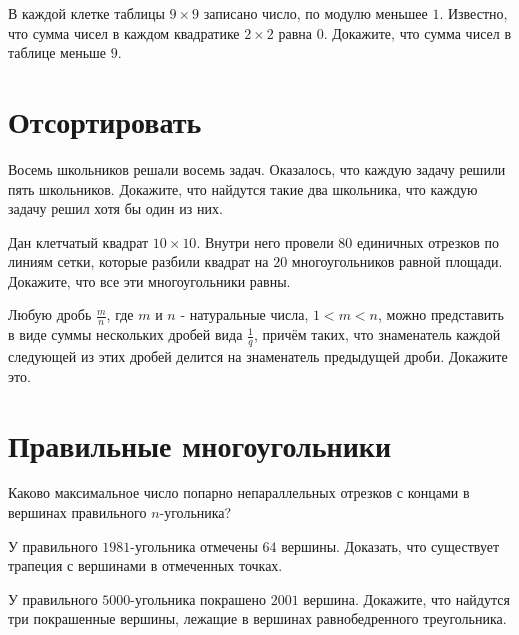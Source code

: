 \documentclass[12pt]{article}
\begin{document}
\begin{task} В каждой клетке таблицы $9 \times 9$ записано число, по модулю меньшее $1$. Известно, что сумма чисел в каждом квадратике $2 \times 2$ равна $0$. Докажите, что сумма чисел в таблице меньше $9$. 
\end{task}


\section*{Отсортировать}

\begin{task}
Восемь школьников решали восемь задач. Оказалось, что каждую задачу решили пять школьников. Докажите, что найдутся такие два школьника, что каждую задачу решил хотя бы один из них. 
\end{task}


\begin{task}
Дан клетчатый квадрат $10 \times 10$. Внутри него провели $80$ единичных отрезков по линиям сетки, которые разбили квадрат на $20$ многоугольников равной площади. Докажите, что все эти многоугольники равны.
\end{task}

\begin{task}
Любую дробь $\frac{m}{n}$, где $m$ и $n$ - натуральные числа, $1 < m < n$, можно представить в виде суммы нескольких дробей вида $\frac{1}{q}$, причём таких, что знаменатель каждой следующей из этих дробей делится на знаменатель предыдущей дроби. Докажите это.
\end{task}

\section*{Правильные многоугольники}

\begin{task}
Каково максимальное число попарно непараллельных отрезков с концами в вершинах правильного $n$-угольника? 
\end{task}

\begin{task}
У правильного $1981$-угольника отмечены $64$ вершины. Доказать, что существует трапеция с вершинами в отмеченных точках.
\end{task}

\begin{task}
У правильного $5000$-угольника покрашено $2001$ вершина. Докажите, что найдутся три покрашенные вершины, лежащие в вершинах равнобедренного треугольника. 
\end{task}
\end{document}
